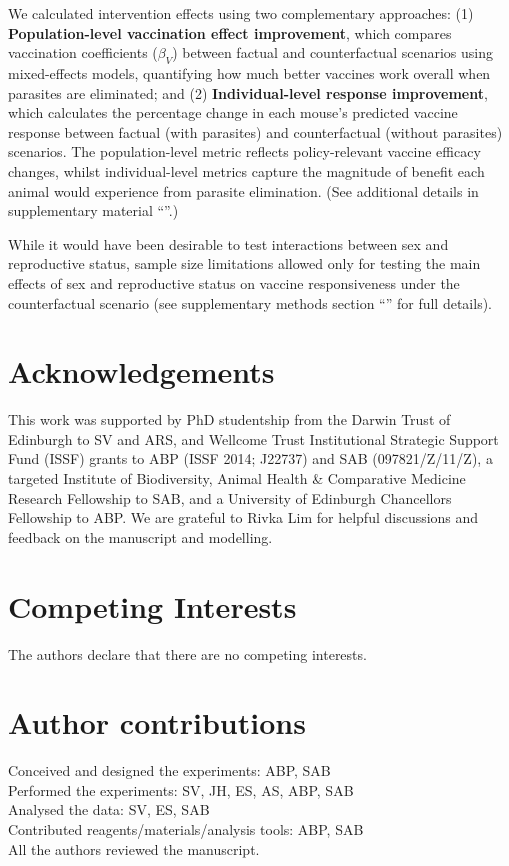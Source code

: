 \documentclass[a4paper, hidelinks, 11pt]{article}
\begin{document}
We calculated intervention effects using two complementary approaches: (1) \textbf{Population-level vaccination effect improvement}, which compares vaccination coefficients ($\beta_V$) between factual and counterfactual scenarios using mixed-effects models, quantifying how much better vaccines work overall when parasites are eliminated; and (2) \textbf{Individual-level response improvement}, which calculates the percentage change in each mouse's predicted vaccine response between factual (with parasites) and counterfactual (without parasites) scenarios. The population-level metric reflects policy-relevant vaccine efficacy changes, whilst individual-level metrics capture the magnitude of benefit each animal would experience from parasite elimination. (See additional details in supplementary material ``''.)

While it would have been desirable to test interactions between sex and reproductive status, sample size limitations allowed only for testing the main effects of sex and reproductive status on vaccine responsiveness under the counterfactual scenario (see supplementary methods section ``'' for full details).

\section{Acknowledgements}

This work was supported by PhD studentship from the Darwin Trust of Edinburgh to SV and ARS, and Wellcome Trust Institutional Strategic Support Fund (ISSF) grants to ABP (ISSF 2014; J22737) and SAB (097821/Z/11/Z), a targeted Institute of Biodiversity, Animal Health \& Comparative Medicine Research Fellowship to SAB, and a University of Edinburgh Chancellors Fellowship to ABP. We are grateful to Rivka Lim for helpful discussions and feedback on the manuscript and modelling.

\section{Competing Interests}

The authors declare that there are no competing interests.

\section{Author contributions}

Conceived and designed the experiments: ABP, SAB \\ Performed the experiments: SV, JH, ES, AS, ABP, SAB \\ Analysed the data: SV, ES, SAB \\
Contributed reagents/materials/analysis tools: ABP, SAB \\ All the authors reviewed the manuscript.
\end{document}
